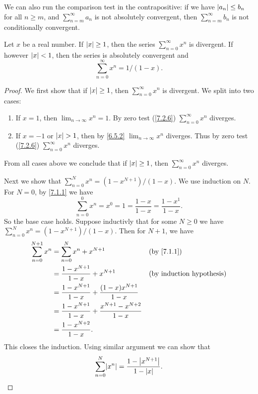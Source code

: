 \begin{note}
  We can also run the comparison test in the contrapositive:
  if we have \(\left\lvert a_n\right\rvert \leq b_n\) for all \(n \geq m\), and \(\sum_{n = m}^\infty a_n\) is not absolutely convergent, then \(\sum_{n = m}^\infty b_n\) is not conditionally convergent.
\end{note}

\begin{lem}\label{7.3.3}
  Let \(x\) be a real number.
  If \(\left\lvert x\right\rvert \geq 1\), then the series \(\sum_{n = 0}^\infty x^n\) is divergent.
  If however \(\left\lvert x\right\rvert < 1\), then the series is absolutely convergent and
  \[
    \sum_{n = 0}^\infty x^n = 1 / (1 - x).
  \]
\end{lem}

\begin{proof}
  We first show that if \(\left\lvert x\right\rvert \geq 1\), then \(\sum_{n = 0}^\infty x^n\) is divergent.
  We split into two cases:
  \begin{enumerate}
    \item If \(x = 1\), then \(\lim_{n \to \infty} x^n = 1\). By zero test (\cref{7.2.6}) \(\sum_{n = 0}^\infty x^n\) diverges.
    \item If \(x = -1\) or \(\left\lvert x\right\rvert > 1\), then by \cref{6.5.2} \(\lim_{n \to \infty} x^n\) diverges.
          Thus by zero test (\cref{7.2.6}) \(\sum_{n = 0}^\infty x^n\) diverges.
  \end{enumerate}
  From all cases above we conclude that if \(\left\lvert x\right\rvert \geq 1\), then \(\sum_{n = 0}^\infty x^n\) diverges.

  Next we show that \(\sum_{n = 0}^N x^n = (1 - x^{N + 1}) / (1 - x)\).
  We use induction on \(N\).
  For \(N = 0\), by \cref{7.1.1} we have
  \[
    \sum_{n = 0}^0 x^n = x^0 = 1 = \dfrac{1 - x}{1 - x} = \dfrac{1 - x^1}{1 - x}.
  \]
  So the base case holds.
  Suppose inductivly that for some \(N \geq 0\) we have \(\sum_{n = 0}^N x^n = (1 - x^{N + 1}) / (1 - x)\).
  Then for \(N + 1\), we have
  \begin{align*}
    \sum_{n = 0}^{N + 1} x^n & = \sum_{n = 0}^N x^n + x^{N + 1}                                      &  & \by{7.1.1} \\
                             & = \dfrac{1 - x^{N + 1}}{1 - x} + x^{N + 1}                            &  & \byIH      \\
                             & = \dfrac{1 - x^{N + 1}}{1 - x} + \dfrac{(1 - x) x^{N + 1}}{1 - x}                     \\
                             & = \dfrac{1 - x^{N + 1}}{1 - x} + \dfrac{x^{N + 1} - x^{N + 2}}{1 - x}                 \\
                             & = \dfrac{1 - x^{N + 2}}{1 - x}.
  \end{align*}
  This closes the induction.
  Using similar argument we can show that
  \[
    \sum_{n = 0}^N \abs{x^n} = \dfrac{1 - \abs{x^{N + 1}}}{1 - \abs{x}}.
  \]


\end{proof}
